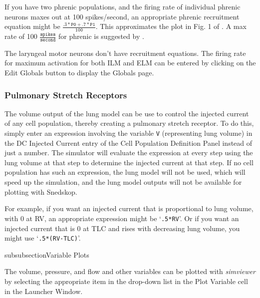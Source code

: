 \documentclass[12pt,openany,oneside]{book}
\newcommand{\ticode}[1]{\texttt{#1}}
\newcommand{\tmcode}[1]{\mathtt{#1}}
\newcommand{\tisamp}[1]{`\texttt{#1}'}
\newcommand{\prog}[1]{\textit{{#1}}}
\begin{document}
If you have two phrenic populations, and the firing rate of individual
phrenic neurons maxes out at 100 spikes/second, an appropriate phrenic
recruitment equation might be $\tmcode{\tfrac{.3*P0+.7*P1}{100}}$. This
approximates the plot in Fig. 1 of \citet{Mantilla201157}.
A max rate of 100 $\tmcode{\tfrac{spikes}{second}}$ for phrenic is suggested by
\citet{springerlink:10.1007/BF00235915}.

The laryngeal motor neurons don't have recruitment equations. 
The firing rate for maximum
activation for both ILM and ELM can be entered by clicking
on the Edit Globals button to display the Globals page.

\subsubsection{Pulmonary Stretch Receptors}

The volume output of the lung model can be use to control the injected
current of any cell population, thereby creating a pulmonary stretch
receptor. To do this, simply enter an expression involving the variable
\ticode{V} (representing lung volume) in the DC Injected Current entry of
the Cell Population Definition Panel instead of just a number. The
simulator will evaluate the expression at every step using the lung
volume at that step to determine the injected current at that step. If
no cell population has such an expression, the lung model will not be
used, which will speed up the simulation, and the lung model outputs
will not be available for plotting with Snedskop.

For example, if you want an injected current that is proportional to
lung volume, with 0 at RV, an appropriate expression might be
\tisamp{.5*RV}. Or if you want an injected current that is 0 at TLC
and rises with decreasing lung volume, you might use
\tisamp{.5*(RV-TLC)}.


subsubsection{Variable Plots}

The volume, pressure, and flow and other variables can be plotted with
\prog{simviewer} by selecting the appropriate item in the drop-down
list in the Plot Variable cell in the Launcher Window.
\end{document}
